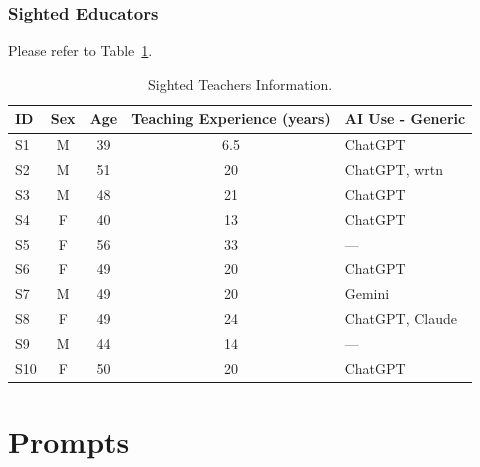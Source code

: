 \subsubsection{Sighted Educators}
Please refer to Table~\ref{tab:sighted_educators_demo}.

\begin{table}[h!]
    \centering
    \footnotesize
    \begin{tabular}{lcccl}
    \toprule
    \textbf{ID} & \textbf{Sex} & \textbf{Age} & \textbf{Teaching Experience (years)} & \textbf{AI Use - Generic} \\
    \midrule
    S1 & M & 39 & 6.5 & ChatGPT \\
    S2 & M & 51 & 20 & ChatGPT, wrtn \\
    S3 & M & 48 & 21 & ChatGPT \\
    S4 & F & 40 & 13 & ChatGPT \\
    S5 & F & 56 & 33 & --- \\
    S6 & F & 49 & 20 & ChatGPT \\
    S7 & M & 49 & 20 & Gemini \\
    S8 & F & 49 & 24 & ChatGPT, Claude \\
    S9 & M & 44 & 14 & --- \\
    S10 & F & 50 & 20 & ChatGPT \\
    \bottomrule
    \end{tabular}
    \caption{Sighted Teachers Information.}
    \label{tab:sighted_educators_demo}
\end{table}




\section{Prompts}\label{app:prompts}

